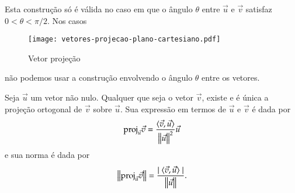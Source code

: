 Esta constru\c{c}\~ao s\'o \'e v\'alida no caso em que o \^angulo $\theta$ entre $\vec{u}$ e $\vec{v}$ satisfaz $0 < \theta < \pi/2$. Nos casos
\begin{figure}
  \centering
  \caption{Vetor proje\c{c}\~ao}
  \texttt{[image: vetores-projecao-plano-cartesiano.pdf]}



      

\end{figure}
n\~ao podemos usar a constru\c{c}\~ao envolvendo o \^angulo $\theta$ entre os vetores.
\begin{proposicao}
  Seja $\vec{u}$ um vetor n\~ao nulo. Qualquer que seja o vetor $\vec{v}$, existe e \'e \'unica a proje\c{c}\~ao ortogonal de $\vec{v}$ sobre $\vec{u}$. Sua express\~ao em termos de $\vec{u}$ e $\vec{v}$ \'e dada por
  \[
    {\rm proj}_{\vec{u}}\vec{v} = \dfrac{\langle \vec{v}, \vec{u} \rangle}{\left\Vert{\vec{u}}\right\Vert^2}\vec{u}
  \]
  e sua norma \'e dada por
  \[
    \left\Vert{{\rm proj}_{\vec{u}}\vec{v}}\right\Vert = \dfrac{\mid\langle \vec{v}, \vec{u} \rangle\mid}{\left\Vert{\vec{u}}\right\Vert}.
  \]
\end{proposicao}
